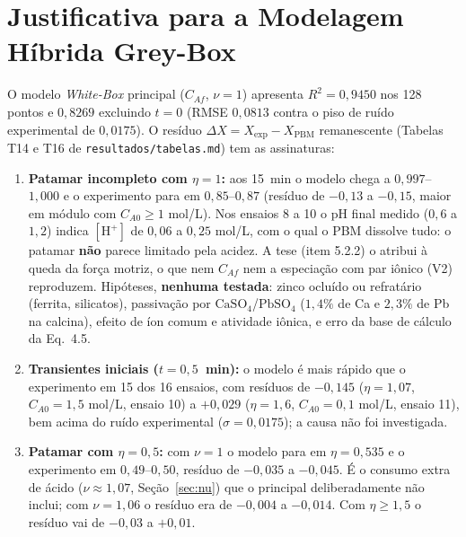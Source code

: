 \documentclass[12pt,a4paper]{article}
\begin{document}
\section{Justificativa para a Modelagem Híbrida Grey-Box}
\label{sec:greybox}

O modelo \textit{White-Box} principal ($C_{Af}$, $\nu = 1$) apresenta $R^2 = 0{,}9450$ nos 128 pontos e $0{,}8269$ excluindo $t = 0$ (RMSE $0{,}0813$ contra o piso de ruído experimental de $0{,}0175$). O resíduo $\Delta X = X_{\text{exp}} - X_{\text{PBM}}$ remanescente (Tabelas T14 e T16 de \texttt{resultados/tabelas.md}) tem as assinaturas:
\begin{enumerate}
    \item \textbf{Patamar incompleto com $\eta = 1$:} aos 15~min o modelo chega a $0{,}997$--$1{,}000$ e o experimento para em $0{,}85$--$0{,}87$ (resíduo de $-0{,}13$ a $-0{,}15$, maior em módulo com $C_{A0} \ge 1$ mol/L). Nos ensaios 8 a 10 o pH final medido ($0{,}6$ a $1{,}2$) indica $[\text{H}^+]$ de $0{,}06$ a $0{,}25$ mol/L, com o qual o PBM dissolve tudo: o patamar \textbf{não} parece limitado pela acidez. A tese (item 5.2.2) o atribui à queda da força motriz, o que nem $C_{Af}$ nem a especiação com par iônico (V2) reproduzem. Hipóteses, \textbf{nenhuma testada}: zinco ocluído ou refratário (ferrita, silicatos), passivação por $\text{CaSO}_4$/$\text{PbSO}_4$ ($1{,}4\%$ de Ca e $2{,}3\%$ de Pb na calcina), efeito de íon comum e atividade iônica, e erro da base de cálculo da Eq.~4.5.
    \item \textbf{Transientes iniciais ($t = 0{,}5$~min):} o modelo é mais rápido que o experimento em 15 dos 16 ensaios, com resíduos de $-0{,}145$ ($\eta = 1{,}07$, $C_{A0} = 1{,}5$ mol/L, ensaio 10) a $+0{,}029$ ($\eta = 1{,}6$, $C_{A0} = 0{,}1$ mol/L, ensaio 11), bem acima do ruído experimental ($\sigma = 0{,}0175$); a causa não foi investigada.
    \item \textbf{Patamar com $\eta = 0{,}5$:} com $\nu = 1$ o modelo para em $\eta = 0{,}535$ e o experimento em $0{,}49$--$0{,}50$, resíduo de $-0{,}035$ a $-0{,}045$. É o consumo extra de ácido ($\nu \approx 1{,}07$, Seção~\ref{sec:nu}) que o principal deliberadamente não inclui; com $\nu = 1{,}06$ o resíduo era de $-0{,}004$ a $-0{,}014$. Com $\eta \ge 1{,}5$ o resíduo vai de $-0{,}03$ a $+0{,}01$.
\end{enumerate}
\end{document}
